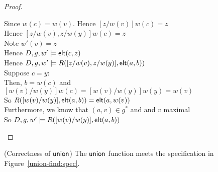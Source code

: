 \begin{proof}
\begin{tabbedproof}
\ooooo Since $w(c) = w(v)$. Hence $[z/w(v)]w(c) = z$ \\
\ooooo Hence $[z/w(v), z/w(y)]w(c) = z$ \\
\ooooo Note $w'(v) = z$ \\
\ooooo Hence $D, g, w' \models \mathsf{elt}({c}, {z})$ \\
\ooooo Hence $D, g, w' \models R([z/w(v), z/w(y)], \mathsf{elt}({a}, {b}))$ \\
\ooo Suppose $c = y$: \\
\oooo Then, $b = w(c)$ and $[w(v)/w(y)]w(c) = [w(v)/w(y)]w(y) = w(v)$ \\
\oooo So $R([w(v)/w(y)], \mathsf{elt}({a}, {b})) = \mathsf{elt}({a}, {w(v)})$ \\
\oooo Furthermore, we know that $(a, v) \in g^*$ and and $v$ maximal \\
\oooo So $D, g, w' \models R([w(v)/w(y)], \mathsf{elt}({a}, {b}))$ 
\end{tabbedproof}
\end{proof}

\begin{lemma}{(Correctness of $\mathsf{union}$)}
The $\mathsf{union}$ function meets the specification in Figure~\ref{union-find:spec}. 
\end{lemma}

